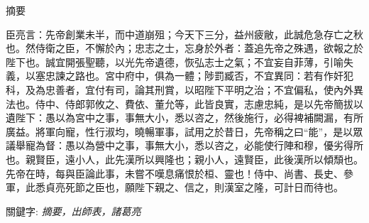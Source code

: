 \begin{titlepage}

\begin{center}
\large{摘要}
\end{center}

臣亮言：先帝創業未半，而中道崩殂；今天下三分，益州疲敝，此誠危急存亡之秋也。然侍衛之臣，不懈於內；忠志之士，忘身於外者：蓋追先帝之殊遇，欲報之於陛下也。誠宜開張聖聽，以光先帝遺德，恢弘志士之氣；不宜妄自菲薄，引喻失義，以塞忠諫之路也。宮中府中，俱為一體；陟罰臧否，不宜異同：若有作奸犯科，及為忠善者，宜付有司，論其刑賞，以昭陛下平明之治；不宜偏私，使內外異法也。侍中、侍郎郭攸之、費依、董允等，此皆良實，志慮忠純，是以先帝簡拔以遺陛下：愚以為宮中之事，事無大小，悉以咨之，然後施行，必得裨補闕漏，有所廣益。將軍向寵，性行淑均，曉暢軍事，試用之於昔日，先帝稱之曰“能”，是以眾議舉寵為督：愚以為營中之事，事無大小，悉以咨之，必能使行陣和穆，優劣得所也。親賢臣，遠小人，此先漢所以興隆也；親小人，遠賢臣，此後漢所以傾頹也。先帝在時，每與臣論此事，未嘗不嘆息痛恨於桓、靈也！侍中、尚書、長史、參軍，此悉貞亮死節之臣也，願陛下親之、信之，則漢室之隆，可計日而待也。

\vspace*{2em}
{關鍵字:} \emph{摘要，出師表，諸葛亮}

\end{titlepage}